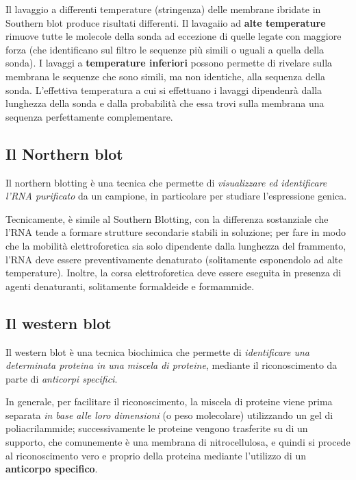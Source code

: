 \documentclass[11pt]{book}
\begin{document}
Il lavaggio a differenti temperature (stringenza) delle membrane
ibridate in Southern blot produce risultati differenti. Il lavagaiio ad
\textbf{alte temperature} rimuove tutte le molecole della sonda ad
eccezione di quelle legate con maggiore forza (che identificano sul
filtro le sequenze più simili o uguali a quella della sonda). I lavaggi
a \textbf{temperature inferiori} possono permette di rivelare sulla
membrana le sequenze che sono simili, ma non identiche, alla sequenza
della sonda. L'effettiva temperatura a cui si effettuano i lavaggi
dipendenrà dalla lunghezza della sonda e dalla probabilità che essa
trovi sulla membrana una sequenza perfettamente complementare.

\subsection{Il Northern blot}\label{il-northern-blot}

Il northern blotting è una tecnica che permette di \emph{visualizzare ed
identificare l'RNA purificato} da un campione, in particolare per
studiare l'espressione genica.

Tecnicamente, è simile al Southern Blotting, con la differenza
sostanziale che l'RNA tende a formare strutture secondarie stabili in
soluzione; per fare in modo che la mobilità elettroforetica sia solo
dipendente dalla lunghezza del frammento, l'RNA deve essere
preventivamente denaturato (solitamente esponendolo ad alte
temperature). Inoltre, la corsa elettroforetica deve essere eseguita in
presenza di agenti denaturanti, solitamente formaldeide e formammide.

\subsection{Il western blot}\label{il-western-blot}

Il western blot è una tecnica biochimica che permette di
\emph{identificare una determinata proteina in una miscela di proteine},
mediante il riconoscimento da parte di \emph{anticorpi specifici}.

In generale, per facilitare il riconoscimento, la miscela di proteine
viene prima separata \emph{in base alle loro dimensioni} (o peso
molecolare) utilizzando un gel di poliacrilammide; successivamente le
proteine vengono trasferite su di un supporto, che comunemente è una
membrana di nitrocellulosa, e quindi si procede al riconoscimento vero e
proprio della proteina mediante l'utilizzo di un \textbf{anticorpo
specifico}.
\end{document}

